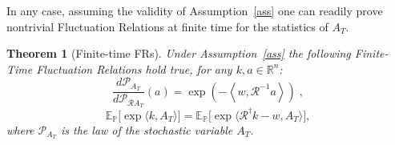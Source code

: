\documentclass[a4paper,11pt]{article}
\numberwithin{equation}{section}
\newtheorem{theorem}{Theorem}[section] %
\begin{document}
In any case, assuming the validity of Assumption~\ref{ass} one can readily prove nontrivial Fluctuation Relations at finite time for the statistics of $A_T$. 
 
\begin{theorem}[Finite-time FRs]\label{thm:result1}
Under Assumption~\ref{ass} the following Finite-Time Fluctuation Relations hold true, for any $k,a \in \mathbb{R}^n$:
  \begin{equation}\label{eq:beau}
\frac{d\mathcal{P}_{A_T}}{d\mathcal{P}_{\mathcal{R}A_T}}(a)=\exp \left(-\left\langle w,\mathcal{R}^{-1} a\right\rangle \right) \; ,
\end{equation}
    \begin{equation}\label{eq:MRF-2-1-1}
\mathbb{E}_{\mathbb{P}}\Big[\exp\Big\langle k,A_T\Big\rangle \Big]=\mathbb{E}_{\mathbb{P}}\Big[\exp \Big\langle \mathcal{R}^{\dagger} k -
w,A_T\Big\rangle \Big] ,
    \end{equation}
where $\mathcal{P}_{A_T}$ is the law of the stochastic variable $A_T$.
\end{theorem}
\end{document}
